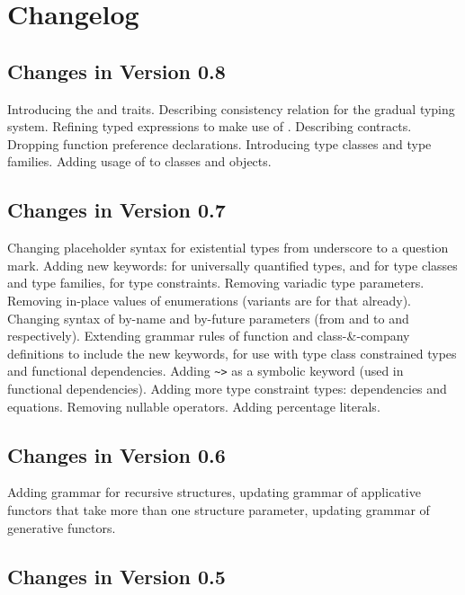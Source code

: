 
\chapter{Changelog}
\label{sec:changelog}

\section*{Changes in Version 0.8}

Introducing the  and  traits. Describing consistency relation for the gradual typing system. Refining typed expressions to make use of . Describing contracts. Dropping function preference declarations. Introducing type classes and type families. Adding usage of  to classes and objects. 

\section*{Changes in Version 0.7}

Changing placeholder syntax for existential types from underscore to a question mark. Adding new keywords:  for universally quantified types,  and  for type classes and type families,  for type constraints. Removing variadic type parameters. Removing in-place values of enumerations (variants are for that already). Changing syntax of by-name and by-future parameters (from \code{=>} and \code{=>>} to \code{->} and \code{->>} respectively). Extending grammar rules of function and class-\&-company definitions to include the new keywords, for use with type class constrained types and functional dependencies. Adding \lstinline!~>! as a symbolic keyword (used in functional dependencies). Adding more type constraint types: dependencies and equations. Removing nullable operators. Adding percentage literals. 

\section*{Changes in Version 0.6}

Adding grammar for recursive structures, updating grammar of applicative functors that take more than one structure parameter, updating grammar of generative functors.  

\section*{Changes in Version 0.5}


